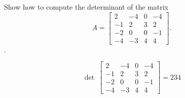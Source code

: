
\begin{exerciseStatement}


Show how to compute the determinant of the matrix \[A= \left[\begin{array}{cccc}
2 & -4 & 0 & -4 \\
-1 & 2 & 3 & 2 \\
-2 & 0 & 0 & -1 \\
-4 & -3 & 4 & 4
\end{array}\right] .\].


\end{exerciseStatement}
    
\begin{exerciseAnswer} 
\[\operatorname{det}\  \left[\begin{array}{cccc}
2 & -4 & 0 & -4 \\
-1 & 2 & 3 & 2 \\
-2 & 0 & 0 & -1 \\
-4 & -3 & 4 & 4
\end{array}\right] = 234 \]
\end{exerciseAnswer}
    
